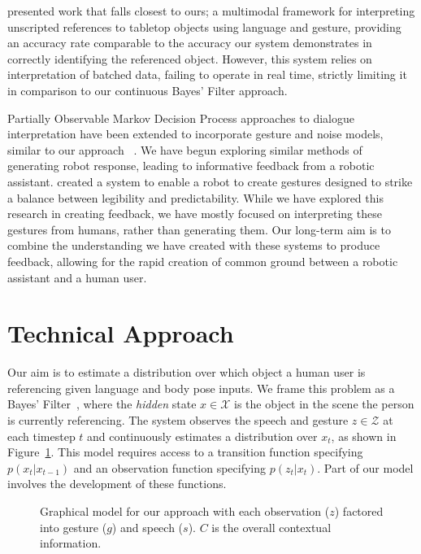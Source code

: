 \documentclass[a4paper, 11pt]{article} %
\begin{document}
\citet{matuszek14} presented work that falls closest to ours; a multimodal framework for interpreting unscripted references to tabletop objects using language and gesture, providing an accuracy rate comparable to the accuracy our system demonstrates in correctly identifying the referenced object. However, this system relies on interpretation of batched data, failing to operate in real time, strictly limiting it in comparison to our continuous Bayes' Filter approach.

Partially Observable Markov Decision Process approaches to dialogue interpretation have been extended to incorporate gesture and noise models, similar to our approach~\citep{young10, young13} . We have begun exploring similar methods of generating robot response, leading to informative feedback from a robotic assistant. \citet{dragan13} created a system to enable a robot to create gestures designed to strike a balance between legibility and predictability. While we have explored this research in creating feedback, we have mostly focused on interpreting these gestures from humans, rather than generating them. Our long-term aim is to combine the understanding we have created with these systems to produce feedback, allowing for the rapid creation of common ground between a robotic assistant and a human user.

\section{Technical Approach}
Our aim is to estimate a distribution over which object a human user is referencing given language and body pose inputs. We frame this problem as a Bayes' Filter~\citep{thrun08}, where the \textit{hidden} state $x \in \mathcal{X}$ is the object in the scene the person is currently referencing. The system observes the speech and gesture $z \in \mathcal{Z}$ at each timestep $t$ and continuously estimates a distribution over $x_t$, as shown in Figure~\ref{fig:model}. This model requires access to a transition function specifying $p(x_t | x_{t-1})$ and an observation function specifying $p(z_t | x_t)$. Part of our model involves the development of these functions.

\begin{figure}[h]
\centering
{}
\caption{Graphical model for our approach with each observation ($z$) factored into gesture ($g$) and speech ($s$). $C$ is the overall contextual information.\label{fig:model}}
\end{figure}
\end{document}
